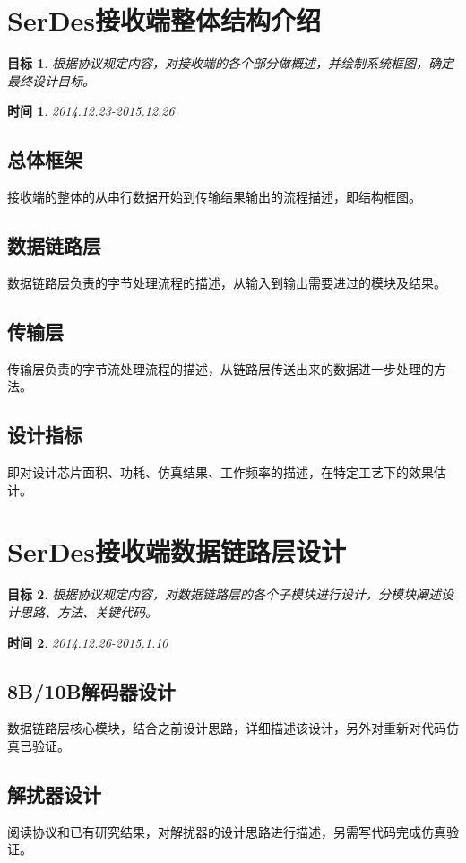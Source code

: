 \documentclass[UTF8]{ctexart}
\newtheorem{aim}{目标}
\newtheorem{deadline}{时间}
\begin{document}
\section{SerDes接收端整体结构介绍}

\begin{aim}{}根据协议规定内容，对接收端的各个部分做概述，并绘制系统框图，确定最终设计目标。\end{aim}
\begin{deadline}{}2014.12.23-2015.12.26\end{deadline}

\subsection{总体框架}
接收端的整体的从串行数据开始到传输结果输出的流程描述，即结构框图。
\subsection{数据链路层}
数据链路层负责的字节处理流程的描述，从输入到输出需要进过的模块及结果。
\subsection{传输层}
传输层负责的字节流处理流程的描述，从链路层传送出来的数据进一步处理的方法。
\subsection{设计指标}
即对设计芯片面积、功耗、仿真结果、工作频率的描述，在特定工艺下的效果估计。

\section{SerDes接收端数据链路层设计}

\begin{aim}{}根据协议规定内容，对数据链路层的各个子模块进行设计，分模块阐述设计思路、方法、关键代码。\end{aim}
\begin{deadline}{}2014.12.26-2015.1.10\end{deadline}

\subsection{8B/10B解码器设计}
数据链路层核心模块，结合之前设计思路，详细描述该设计，另外对重新对代码仿真已验证。

\subsection{解扰器设计}
阅读协议和已有研究结果，对解扰器的设计思路进行描述，另需写代码完成仿真验证。
\end{document}
